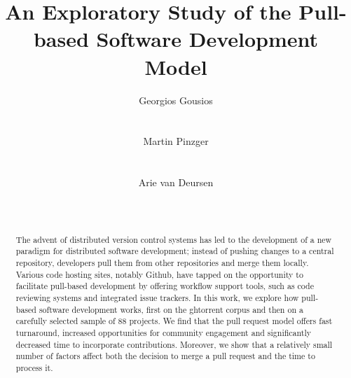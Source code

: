 \documentclass{acm_proc_article-sp}
\begin{document}
\newcommand{\todo}[1]{\textbf{TODO}\footnote{\textbf{TODO:} #1}}

\newcommand{\ghtorrent}{ \textsc{ght}orrent\xspace}
\newcommand{\api}{\textsc{api}\xspace}

\title{An Exploratory Study of the Pull-based Software Development Model}

\author{
\alignauthor
Georgios Gousios\\
       \\
       \\
\alignauthor
Martin Pinzger\\
       \\
       \\
\alignauthor
Arie van Deursen\\
       \\
       \\       
}

\maketitle

\begin{abstract}

  The advent of distributed version control systems has led to the development
  of a new paradigm for distributed software development; instead of pushing
  changes to a central repository, developers pull them from other repositories
  and merge them locally. Various code hosting sites, notably Github, have
  tapped on the opportunity to facilitate pull-based development by offering
  workflow support tools, such as code reviewing systems and integrated issue
  trackers. In this work, we explore how pull-based software development works,
  first on the {\sc ght}orrent corpus and then on a carefully selected sample of 88
  projects. We find that the pull request model offers fast turnaround,
  increased opportunities for community engagement and significantly decreased
  time to incorporate contributions. Moreover, we show that a relatively
  small number of factors affect both the decision to merge a pull request and
  the time to process it.

\end{abstract}
\end{document}

